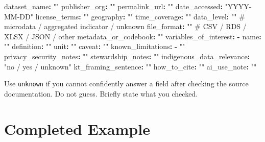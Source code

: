 \documentclass[
  letterpaper,
  DIV=11,
  numbers=noendperiod,
  oneside]{scrreprt}
\newenvironment{Shaded}{\begin{snugshade}}{\end{snugshade}}
\newcommand{\AttributeTok}[1]{\textcolor[rgb]{0.40,0.45,0.13}{#1}}
\newcommand{\CommentTok}[1]{\textcolor[rgb]{0.37,0.37,0.37}{#1}}
\newcommand{\FunctionTok}[1]{\textcolor[rgb]{0.28,0.35,0.67}{#1}}
\newcommand{\KeywordTok}[1]{\textcolor[rgb]{0.00,0.23,0.31}{\textbf{#1}}}
\newcommand{\StringTok}[1]{\textcolor[rgb]{0.13,0.47,0.30}{#1}}
\begin{document}
\begin{Shaded}
\begin{Highlighting}[numbers=left,,]
\FunctionTok{dataset\_name}\KeywordTok{:}\AttributeTok{ }\StringTok{""}
\FunctionTok{publisher\_org}\KeywordTok{:}\AttributeTok{ }\StringTok{""}
\FunctionTok{permalink\_url}\KeywordTok{:}\AttributeTok{ }\StringTok{""}
\FunctionTok{date\_accessed}\KeywordTok{:}\AttributeTok{ }\StringTok{"YYYY{-}MM{-}DD"}
\FunctionTok{license\_terms}\KeywordTok{:}\AttributeTok{ }\StringTok{""}
\FunctionTok{geography}\KeywordTok{:}\AttributeTok{ }\StringTok{""}
\FunctionTok{time\_coverage}\KeywordTok{:}\AttributeTok{ }\StringTok{""}
\FunctionTok{data\_level}\KeywordTok{:}\AttributeTok{ }\StringTok{""}\CommentTok{   \# microdata / aggregated indicator / unknown}
\FunctionTok{file\_format}\KeywordTok{:}\AttributeTok{ }\StringTok{""}\CommentTok{  \# CSV / RDS / XLSX / JSON / other}
\FunctionTok{metadata\_or\_codebook}\KeywordTok{:}\AttributeTok{ }\StringTok{""}
\FunctionTok{variables\_of\_interest}\KeywordTok{:}
\AttributeTok{  }\KeywordTok{{-}}\AttributeTok{ }\FunctionTok{name}\KeywordTok{:}\AttributeTok{ }\StringTok{""}
\AttributeTok{    }\FunctionTok{definition}\KeywordTok{:}\AttributeTok{ }\StringTok{""}
\AttributeTok{    }\FunctionTok{unit}\KeywordTok{:}\AttributeTok{ }\StringTok{""}
\AttributeTok{    }\FunctionTok{caveat}\KeywordTok{:}\AttributeTok{ }\StringTok{""}
\FunctionTok{known\_limitations}\KeywordTok{:}
\AttributeTok{  }\KeywordTok{{-}}\AttributeTok{ }\StringTok{""}
\FunctionTok{privacy\_security\_notes}\KeywordTok{:}\AttributeTok{ }\StringTok{""}
\FunctionTok{stewardship\_notes}\KeywordTok{:}\AttributeTok{ }\StringTok{""}
\FunctionTok{indigenous\_data\_relevance}\KeywordTok{:}\AttributeTok{ }\StringTok{"no / yes / unknown"}
\FunctionTok{kt\_framing\_sentence}\KeywordTok{:}\AttributeTok{ }\StringTok{""}
\FunctionTok{how\_to\_cite}\KeywordTok{:}\AttributeTok{ }\StringTok{""}
\FunctionTok{ai\_use\_note}\KeywordTok{:}\AttributeTok{ }\StringTok{""}
\end{Highlighting}
\end{Shaded}

Use \texttt{unknown} if you cannot confidently answer a field after
checking the source documentation. Do not guess. Briefly state what you
checked.

\section*{Completed Example}\label{completed-example}
\end{document}
